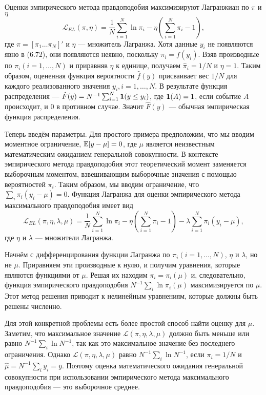 Оценки эмпирического метода правдоподобия максимизируют Лагранжиан по $\pi$ и $\eta$
\begin{equation}
\mathcal{L}_{EL}(\pi,\eta)= \frac{1}{N} \sum_{i=1}^{N} \ln \pi_i - \eta \left( \sum_{i=1}^{N} \pi_i - 1 \right),
\end{equation}
где $\pi=[\pi_1 \dots \pi_N]'$ и $\eta$ --- множитель Лагранжа. Хотя данные $y_i$ не появляются явно в (6.72), они появляются неявно, поскольку $\pi_i=f(y_i)$. Взяв производные по $\pi_i (i=1, \dots, N)$ и приравняв $\eta$ к единице, получаем $\hat{\pi}_i=1/N$ и $\eta=1$. Таким образом, оцененная функция вероятности $\hat{f}(y)$ присваивает вес $1/N$ для каждого реализованного значения $y_i, i=1, \dots, N$. В результате функция распределения --- $\hat{F}(y) = N^{-1} \sum_{i=1}^N {\bf{1}} (y \le y_i)$, где ${\bf{1}}(A)=1$, если событие $A$ происходит, и $0$ в противном случае. Значит $\hat{F}(y)$ --- обычная эмпирическая функция распределения.

Теперь введём параметры. Для простого примера предположим, что мы вводим моментное ограничение, $\mathbb{E}[y-\mu]=0$, где $\mu$ является неизвестным математическим ожиданием генеральной совокупности. В контексте эмпирического метода правдоподобия этот теоретический момент заменяется выборочным моментом, взвешивающим выборочные значения с помощью вероятностей $\pi_i$. Таким образом, мы вводим ограничение, что $\sum_i \pi_i (y_i -\mu)=0$. Функция Лагранжа для оценки эмпирического метода максимального правдоподобия имеет вид
\begin{equation}
\mathcal{L}_{EL}(\pi,\eta,\lambda,\mu) = \frac{1}{N} \sum_{i=1}^{N} \ln \pi_i - \eta \left( \sum_{i=1}^{N} \pi_i -1 \right) - \lambda \sum_{i=1}^{N} \pi_i (y_i -\mu),
\end{equation}
где $\eta$ и $\lambda$ --- множители Лагранжа.

Начнём с дифференцирования функции Лагранжа по $\pi_i (i=1, \dots, N)$, $\eta$ и
$\lambda$, но не $\mu$. Приравняем эти производные к нулю, и получим уравнения, которые являются функциями от $\mu$. Решая их находим $\pi_i=\pi_i(\mu)$ и, следовательно, функция эмпирического правдоподобия $N^{-1} \sum_i \ln \pi_i (\mu)$ максимизируется по $\mu$. Этот метод решения приводит к нелинейным уравнениям, которые должны быть решены численно.

Для этой конкретной проблемы есть более  простой способ найти оценку для $\mu$. Заметим, что максимальное значение $\mathcal{L}(\pi,\eta,\lambda,\mu)$ должно быть меньше или равно $N^{-1} \sum_i \ln N^{-1}$, так как это максимальное значение без последнего ограничения. Однако  $\mathcal{L}(\pi,\eta,\lambda,\mu)$ равно $N^{-1} \sum_i \ln N^{-1}$, если $\pi_i = 1/ N$ и $\hat{\mu}=N^{-1} \sum_i y_i = \bar{y}$. Поэтому оценка математического ожидания генеральной совокупности при использовании эмпирического метода максимального правдоподобия --- это выборочное среднее.

